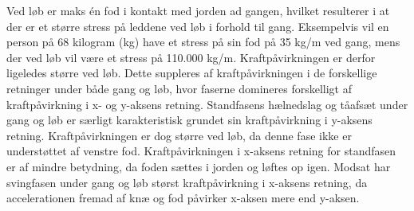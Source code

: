 Ved løb er maks én fod i kontakt med jorden ad gangen, hvilket resulterer i at der er et større stress på leddene ved løb i forhold til gang. Eksempelvis vil en person på 68 kilogram (kg) have et stress på sin fod på 35 kg/m ved gang, mens der ved løb vil være et stress på 110.000 kg/m. Kraftpåvirkningen er derfor ligeledes større ved løb. \citep{Adelaar1986} Dette suppleres af kraftpåvirkningen i de forskellige retninger under både gang og løb, hvor faserne domineres forskelligt af kraftpåvirkning i x- og y-aksens retning. \newline 
Standfasens hælnedslag og tåafsæt under gang og løb  er særligt karakteristisk grundet sin kraftpåvirkning i y-aksens retning. Kraftpåvirkningen er dog større ved løb, da denne fase ikke er understøttet af venstre fod. Kraftpåvirkningen i x-aksens retning for standfasen er af mindre betydning, da foden sættes i jorden og løftes op igen. Modsat har svingfasen under gang og løb størst kraftpåvirkning i x-aksens retning, da accelerationen fremad af knæ og fod påvirker x-aksen mere end y-aksen. \citep{Rueterbories2010} 

